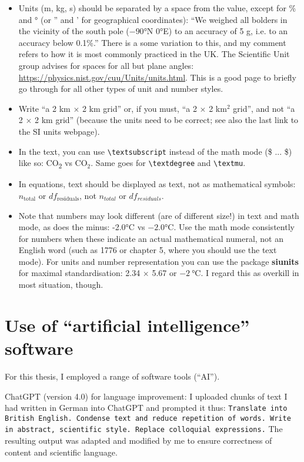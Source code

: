 \begin{itemize}
\item Units (m, kg, s) should be separated by a space from the value, except for \% and ° (or '' and ' for geographical coordinates): ``We weighed all bolders in the vicinity of the south pole ($-90$°N $0$°E) to an accuracy of 5 g, i.e. to an accuracy below 0.1\%.'' There is a some variation to this, and my comment refers to how it is most commonly practiced in the UK. The Scientific Unit group advises for spaces for all but plane angles: \url{https://physics.nist.gov/cuu/Units/units.html}. This is a good page to briefly go through for all other types of unit and number styles.

\item Write ``a 2 km $\times$ 2 km grid'' or, if you must, ``a 2 $\times$ 2 km$^2$ grid'', and not ``a 2 $\times$ 2 km grid'' (because the units need to be correct; see also the last link to the SI units webpage).

\item In the text, you can use \texttt{\textbackslash textsubscript} instead of the math mode (\$ ... \$) like so: CO\textsubscript{2} vs CO$_2$. Same goes for \texttt{\textbackslash textdegree} and \texttt{\textbackslash textmu}.

\item In equations, text should be displayed as text, not as mathematical symbols: $n_\text{total}$ or $df_\text{residuals}$, not $n_{total}$ or $df_{residuals}$.

\item Note that numbers may look different (are of different size!) in text and math mode, as does the minus: -2.0°C vs $-2.0$°C. Use the math mode consistently for numbers when these indicate an actual mathematical numeral, not an English word (such as 1776 or chapter 5, where you should use the text mode). For units and number representation you can use the package \textbf{siunits} for maximal standardisation: \num{2.34} $\times$ \num{5.67} or $\SI{-2}{\celsius}$. I regard this as overkill in most situation, though.
\end{itemize}  
 
\section{Use of ``artificial intelligence'' software}
For this thesis, I employed a range of software tools (``AI'').

ChatGPT (version 4.0) for language improvement: I uploaded chunks of text I had written in German into ChatGPT and prompted it thus: \texttt{Translate into British English. Condense text and reduce repetition of words. Write in abstract, scientific style. Replace colloquial expressions.} The resulting output was adapted and modified by me to ensure correctness of content and scientific language.

